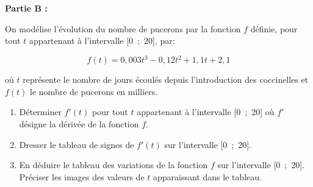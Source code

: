 \documentclass[10pt]{article}
\begin{document}
\textbf{Partie B :}

\medskip

On modélise l'évolution du nombre de pucerons par la fonction $f$ définie, pour tout $t$ appartenant à l'intervalle [0~;~20], par:

\[f(t) = 0,003t^3 - 0,12t^2 + 1,1t + 2,1\]

où $t$ représente le nombre de jours écoulés depuis l'introduction des coccinelles et
$f(t)$ le nombre de pucerons en milliers.

\medskip

\begin{enumerate}
\item Déterminer $f'(t)$ pour tout $t$ appartenant à l'intervalle [0~;~20] où $f'$ désigne la
dérivée de la fonction $f$.
\item Dresser le tableau de signes de $f'(t)$ sur l'intervalle [0~;~20].
\item En déduire le tableau des variations de la fonction $f$ sur l'intervalle [0~;~20]. Préciser les images des valeurs de $t$ apparaissant dans le tableau.
\end{enumerate}
\end{document}
